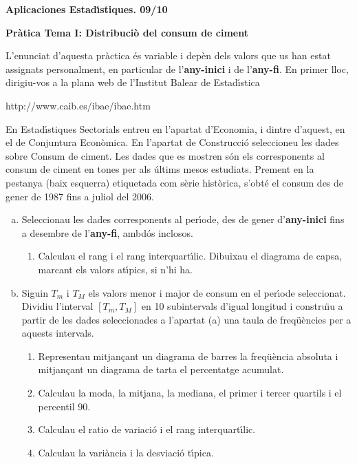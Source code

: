 \documentclass[11pt]{article}
\begin{document}
\begin{center}
\textbf{{\large{Aplicaciones Estad\'{\i}stiques.  09/10}}}

\vspace{0.5cm}

\textbf{Pr\`atica Tema I: Distribuci\`o del consum de ciment}
\end{center} 

L'enunciat d'aquesta pr\`actica \'es variable i dep\`en dels valors que us han estat assignats personalment, en particular de l'\textbf{any-inici} i de l'\textbf{any-fi}. En primer lloc, dirigiu-vos a la plana web de l'Institut Balear de Estad\'{\i}stica 
\begin{center}
http://www.caib.es/ibae/ibae.htm
\end{center}
En Estad\'{\i}stiques Sectorials entreu en l'apartat d'Economia, i dintre d'aquest, en el de Conjuntura Econ\`omica. En l'apartat de Construcci\'o seleccioneu les dades sobre Consum de ciment. Les dades que es mostren s\'on els corresponents al consum de ciment en tones per als \'ultims mesos estudiats. Prement en la pestanya (baix esquerra) etiquetada com s\`erie hist\`orica, s'obt\'e el consum des de gener de 1987 fins a juliol del 2006.

\begin{enumerate}[a)]
\item  Seleccionau les dades corresponents al per\'{\i}ode, des de gener d'\textbf{any-inici} fins a desembre de l'\textbf{any-fi}, ambd\'os inclosos.
\begin{enumerate}[1-]
\item Calculau el rang i el rang interquart\'{\i}lic. Dibuixau el diagrama de capsa, marcant els valors at\'{\i}pics, si n'hi ha. 
\end{enumerate}
\item  Siguin $T_m$ i $T_M$ els valors menor i major de consum en el per\'{\i}ode seleccionat. Dividiu l'interval $[T_m,T_M]$ en 10 subintervals d'igual longitud i constru\"{\i}u a partir de les dades seleccionades a l'apartat (a) una taula de freq\"u\`encies per a aquests intervals.
\begin{enumerate}[1-]
\item Representau mitjan\c{c}ant un diagrama de barres la freq\"u\`encia absoluta i mitjan\c{c}ant un diagrama de 
tarta el percentatge acumulat.
\item  Calculau la moda, la mitjana, la mediana, el primer i tercer quartils i el percentil
90.
\item  Calculau el ratio de variaci\'o i el rang interquart\'{\i}lic. 
\item  Calculau la vari\`ancia i la desviaci\'o t\'{\i}pica.
\end{enumerate}
\end{enumerate}
\end{document}
